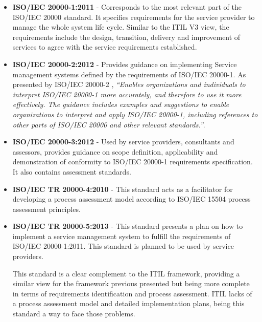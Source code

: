 \begin{itemize}
  \item \textbf{ISO/IEC 20000-1:2011} -  Corresponds to the most relevant part of the ISO/IEC 20000 standard. It specifies requirements for the service provider to manage the whole system life cycle. Similar to the ITIL V3 view, the requirements include the design, transition, delivery and improvement of services to agree with the service requirements established\cite{ISO20000-1}.\par
  
  \vspace{5mm}
  
  \item \textbf{ISO/IEC 20000-2:2012} - Provides guidance on implementing Service management systems defined by the requirements of ISO/IEC 20000-1. As presented by ISO/IEC 20000-2 \cite{ISO20000-2}, \textit{``Enables organizations and individuals to interpret ISO/IEC 20000-1 more accurately, and therefore to use it more effectively. The guidance includes examples and suggestions to enable organizations to interpret and apply ISO/IEC 20000-1, including references to other parts of ISO/IEC 20000 and other relevant standards.''}.\par
  
  \vspace{5mm}
  
  \item \textbf{ISO/IEC 20000-3:2012} - Used by service providers, consultants and assessors, provides guidance on scope definition, applicability and demonstration of conformity to ISO/IEC 20000-1 requirements specification. It also contains assessment standards.\cite{ISO20000-3}\par
  \vspace{5mm}
  
  \item \textbf{ISO/IEC TR 20000-4:2010} - This standard acts as a facilitator for developing a process assessment model according to ISO/IEC 15504 process assessment principles.\cite{ISO20000-4}\par
  
  \vspace{5mm}
  
  \item \textbf{ISO/IEC TR 20000-5:2013} - This standard presents a plan on how to implement a service management system to fulfill the requirements of ISO/IEC 20000-1:2011. This standard is planned to be used by service providers.\cite{ISO20000-5}\par
  
  \vspace{5mm}

  This standard is a clear complement to the ITIL framework, providing a similar view for the framework previous presented but being more complete in terms of requirements identification and process assessment. ITIL lacks of a process assessment model and detailed implementation plans, being this standard a way to face those problems.\par
  
\end{itemize}

